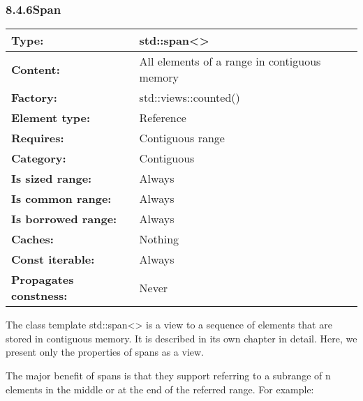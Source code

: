 \subsubsection*{ 8.4.6\hspace{0.2cm}Span}

\begin{longtable}[c]{|l|l|}
\hline
\textbf{Type:}                 & std::span\textless{}\textgreater{}           \\ \hline
\endfirsthead
%
\endhead
%
\textbf{Content:}              & All elements of a range in contiguous memory \\ \hline
\textbf{Factory:}              & std::views::counted()                        \\ \hline
\textbf{Element type:}         & Reference                                    \\ \hline
\textbf{Requires:}             & Contiguous range                             \\ \hline
\textbf{Category:}             & Contiguous                                   \\ \hline
\textbf{Is sized range:}       & Always                                       \\ \hline
\textbf{Is common range:}      & Always                                       \\ \hline
\textbf{Is borrowed range:}    & Always                                       \\ \hline
\textbf{Caches:}               & Nothing                                      \\ \hline
\textbf{Const iterable:}       & Always                                       \\ \hline
\textbf{Propagates constness:} & Never                                        \\ \hline
\end{longtable}

The class template std::span<> is a view to a sequence of elements that are stored in contiguous memory. It is described in its own chapter in detail. Here, we present only the properties of spans as a view.

The major benefit of spans is that they support referring to a subrange of n elements in the middle or at the end of the referred range. For example:

